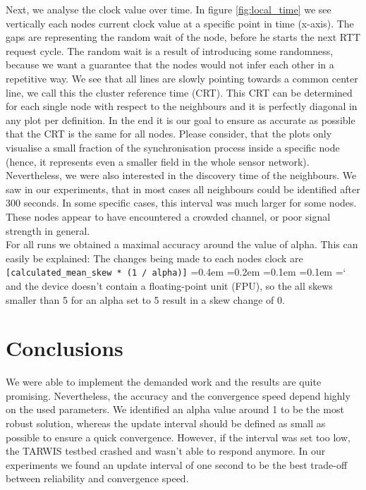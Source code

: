 \documentclass{llncs}
\newcommand{\code}[1]{%
	\texttt{#1}%
	\fontdimen2\font=0.4em
	\fontdimen3\font=0.2em
	\fontdimen4\font=0.1em
	\fontdimen7\font=0.1em
	\hyphenchar\font=`\-
}
\begin{document}
\noindent Next, we analyse the clock value over time. In figure \ref{fig:local_time} we see vertically each nodes current clock value at a specific point in time (x-axis). The gaps are representing the random wait of the node, before he starts the next RTT request cycle. The random wait is a result of introducing some randomness, because we want a guarantee that the nodes would not infer each other in a repetitive way. We see that all lines are slowly pointing towards a common center line, we call this the cluster reference time (CRT). This CRT can be determined for each single node with respect to the neighbours and it is perfectly diagonal in any plot per definition. In the end it is our goal to ensure as accurate as possible that the CRT is the same for all nodes. Please consider, that the plots only visualise a small fraction of the synchronisation process inside a specific node (hence, it represents even a smaller field in the whole sensor network).\\

\noindent Nevertheless, we were also interested in the discovery time of the neighbours. We saw in our experiments, that  in most cases all neighbours could be identified after 300 seconds. In some specific cases, this interval was much larger for some nodes. These nodes appear to have encountered a crowded channel, or poor signal strength in general.\\

\noindent For all runs we obtained a maximal accuracy around the value of alpha. This can easily be explained: The changes being made to each nodes clock are \code{[calculated\_mean\_skew * (1 / alpha)]} and the device doesn't contain a float\-ing-point unit (FPU), so the all skews smaller than 5 for an alpha set to 5 result in a skew change of 0.

\section{Conclusions}

We were able to implement the demanded work and the results are quite promising. Nevertheless, the accuracy and the convergence speed depend highly on the used parameters. We identified an alpha value around 1 to be the most robust solution, whereas the update interval should be defined as small as possible to ensure a quick convergence. However, if the interval was set too low, the TARWIS testbed crashed and wasn't able to respond anymore. In our experiments we found an update interval of one second to be the best trade-off between reliability and convergence speed. 

{}



%
%
\end{document}
